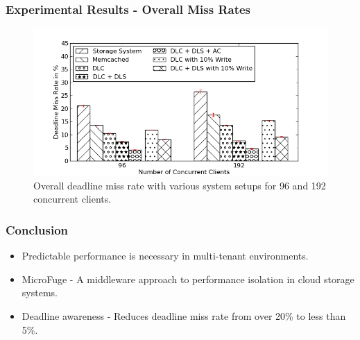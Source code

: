 \documentclass{beamer}
\begin{document}
\begin{frame}
  \frametitle{Experimental Results - Overall Miss Rates}
  \begin{figure}[t]
    \begin{center}
      \centerline{\includegraphics[scale=0.5]{img/EC2/EC2_BAR/miss_bar.png}}
      \caption{Overall deadline miss rate with various system setups for
        96 and 192 concurrent clients.}
      \label{fig:bar_miss}
    \end{center}
  \end{figure}
\end{frame}

\begin{frame}
  \frametitle{Conclusion}
  \begin{itemize}
  \item Predictable performance is necessary in multi-tenant environments.
  \item MicroFuge - A middleware approach to performance isolation in cloud
    storage systems.
  \item Deadline awareness - Reduces deadline miss rate from over 20\% to
    less than 5\%.
  \end{itemize}
\end{frame}
\end{document}
